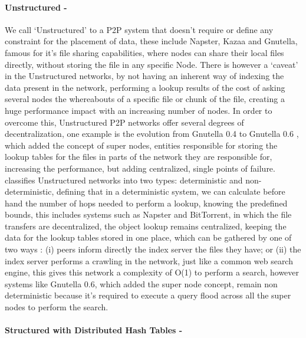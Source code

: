 \documentclass{./llncs2e/llncs}
\begin{document}
\paragraph{\textbf{Unstructured -}} %
\label{par:Unstructured}

We call `Unstructured' to a P2P system that doesn't require or define any constraint for the placement of data, these include Napster, Kazaa and Gnutella, famous for it's file sharing capabilities, where nodes can share their local files directly, without storing the file in any specific Node. There is however a `caveat' in the Unstructured networks, by not having an inherent way of indexing the data present in the network, performing a lookup results of the cost of asking several nodes the whereabouts of a specific file or chunk of the file, creating a huge performance impact with an increasing number of nodes. In order to overcome this, Unstructured P2P networks offer several degrees of decentralization, one example is the evolution from Gnutella 0.4\cite{Definition2003} to Gnutella 0.6 \cite{T.Klingberg2002}\cite{Ripeanu2002a}, which added the concept of super nodes, entities responsible for storing the lookup tables for the files in parts of the network they are responsible for, increasing the performance, but adding centralized, single points of failure. 
\cite{Ranjan2006} classifies Unstructured networks into two types: deterministic and non-deterministic, defining that in a deterministic system, we can calculate before hand the number of hops needed to perform a lookup, knowing the predefined bounds, this includes systems such as Napster and BitTorrent\cite{Cohen2009}, in which the file transfers are decentralized, the object lookup remains centralized, keeping the data for the lookup tables stored in one place, which can be gathered by one of two ways : (i) peers inform directly the index server the files they have; or (ii) the index server performs a crawling in the network, just like a common web search engine, this gives this network a complexity of O(1) to perform a search, however systems like Gnutella 0.6, which added the super node concept, remain non deterministic because it's required to execute a query flood across all the super nodes to perform the search.


\paragraph{\textbf{Structured with Distributed Hash Tables -}} %
\label{par:Structured with Distributed Hash Tables}
\end{document}
